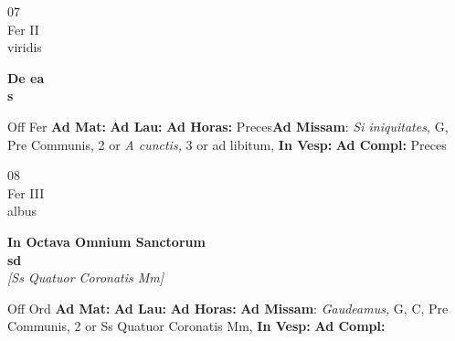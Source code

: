 \documentclass[10pt, openany]{book}
\begin{document}
        \begin{center}
            \begin{minipage}{3.5in}
                \vspace{2em}
                \begin{minipage}{0.5in}
                    {\Huge 07} \\
                    {\normalsize Fer II} \\
                    {\normalsize viridis}
                \end{minipage}
                \begin{minipage}{3.0in}
                    \textbf{ \large De ea \\
                    \textnormal{\normalsize s}} \\ 
                \end{minipage}
                \begin{justify}Off Fer
                    \textbf{Ad Mat: }
                    \textbf{Ad Lau: }
                    \textbf{Ad Horas: }Preces\textbf{Ad Missam}: \textit{Si iniquitates,} G, Pre Communis, 2 or \textit{A cunctis,} 3 or ad libitum,  
                    \textbf{In Vesp: }
                    \textbf{Ad Compl: }Preces
                \end{justify}
            \end{minipage}
        \end{center}
    
        \begin{center}
            \begin{minipage}{3.5in}
                \vspace{2em}
                \begin{minipage}{0.5in}
                    {\Huge 08} \\
                    {\normalsize Fer III} \\
                    {\normalsize albus}
                \end{minipage}
                \begin{minipage}{3.0in}
                    \textbf{ \large In Octava Omnium Sanctorum \\
                    \textnormal{\normalsize sd}} \\ \textit{[Ss Quatuor Coronatis Mm]} \\ 
                \end{minipage}
                \begin{justify}Off Ord
                    \textbf{Ad Mat: }
                    \textbf{Ad Lau: }
                    \textbf{Ad Horas: }\textbf{Ad Missam}: \textit{Gaudeamus,} G, C, Pre Communis, 2 or Ss Quatuor Coronatis Mm,  
                    \textbf{In Vesp: }
                    \textbf{Ad Compl: }
                \end{justify}
            \end{minipage}
        \end{center}
    
\end{document}
